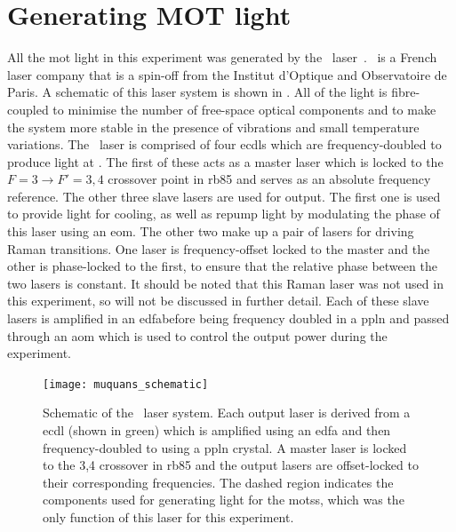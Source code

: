 \section{Generating MOT light}\label{sec:muquans_light}
All the \ac{mot} light in this experiment was generated by the \Muquans\
laser~\cite{muquansWebPage}. \Muquans\ is a French laser company that is a
spin-off from the Institut d'Optique and Observatoire de Paris. A schematic of
this laser system is shown in \FigureRef{fig:muquans_schematic}. All of the
light is fibre-coupled to minimise the number of free-space optical components
and to make the system more stable in the presence of vibrations and small
temperature variations. The \Muquans\ laser is comprised of four
\sivalue{1560}{\nano\metre} \acp{ecdl} which are frequency-doubled to produce
light at \sivalue{780}{\nano\metre}. The first of these acts as a master laser
which is locked to the \(F = 3 \rightarrow F' = 3,4\) crossover point in
\ac{rb85} and serves as an absolute frequency reference. The other three slave
lasers are used for output. The first one is used to provide light for cooling,
as well as repump light by modulating the phase of this laser using an \ac{eom}.
The other two make up a pair of lasers for driving Raman transitions. One laser
is frequency-offset locked to the master and the other is phase-locked to the
first, to ensure that the relative phase between the two lasers is constant. It
should be noted that this Raman laser was not used in this experiment, so will
not be discussed in further detail. Each of these slave lasers is amplified in
an \ac{edfa}before being frequency doubled in a \ac{ppln} and passed through an
\ac{aom} which is used to control the output power during the experiment.
\begin{figure}[!htbp]
	\texttt{[image: muquans\_schematic]}
	\caption[\Muquans\ Laser System Diagram]{Schematic of the \Muquans\ laser system. Each output laser is derived from a \acs{ecdl} (shown in green) which is amplified using an \acs{edfa} and then frequency-doubled to  using a \acs{ppln} crystal. A master laser is locked to the 3,4 crossover in \ac{rb85} and the output lasers are offset-locked to their corresponding frequencies. The dashed region indicates the components used for generating light for the \acp{mots}, which was the only function of this laser for this experiment.}\label{fig:muquans_schematic}
\end{figure}
